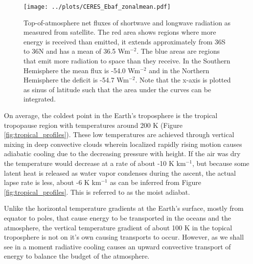 \documentclass[12pt]{book}
\begin{document}
\begin{figure}
\begin{center}
\texttt{[image: ../plots/CERES\_Ebaf\_zonalmean.pdf]}
\end{center}
\caption{ Top-of-atmosphere net fluxes of shortwave and longwave radiation as measured from satellite. The red area shows regions where more energy is received than emitted, it extends approximately from 36S to 36N and has a mean of 36.5 Wm$^{-2}$. The blue areas are regions that emit more radiation to space than they receive. In the Southern Hemisphere the mean flux is -54.0 Wm$^{-2}$ and in the Northern Hemisphere the deficit is -54.7 Wm$^{-2}$. Note that the x-axis is plotted as sinus of latitude such that the area under the curves can be integrated. } 
\label{fig:ceres_fluxes}
\end{figure}

On average, the coldest point in the Earth's troposphere is the tropical tropopause region with temperatures around 200 K (Figure \ref{fig:tropical_profiles}). These low temperatures are achieved through vertical mixing in deep convective clouds wherein localized rapidly rising motion causes adiabatic cooling due to the decreasing pressure with height. If the air was dry the temperature would decrease at a rate of about -10 K km$^{-1}$, but because some latent heat is released as water vapor condenses during the ascent, the actual lapse rate is less, about -6 K km$^{-1}$ as can be inferred from Figure \ref{fig:tropical_profiles}. This is referred to as the moist adiabat.

Unlike the horizontal temperature gradients at the Earth's surface, mostly from equator to poles, that cause energy to be transported in the oceans and the atmosphere, the vertical temperature gradient of about 100 K in the topical troposphere is not on it's own causing transports to occur. However, as we shall see in a moment radiative cooling causes an upward convective  transport of energy to balance the budget of the atmosphere.
\end{document}
